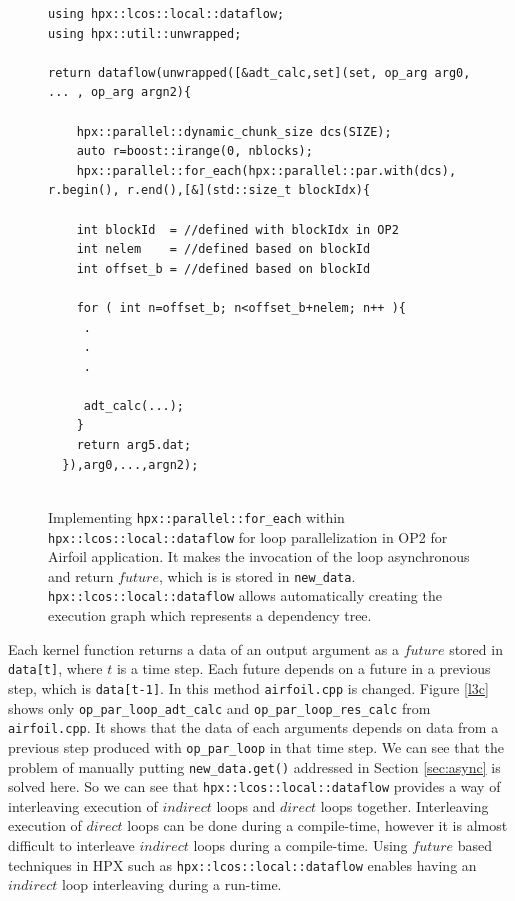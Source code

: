 \documentclass[conference]{IEEEtran}
\begin{document}
\begin{figure}
    \begin{lstlisting}    
using hpx::lcos::local::dataflow;
using hpx::util::unwrapped;    

return dataflow(unwrapped([&adt_calc,set](set, op_arg arg0, ... , op_arg argn2){

    hpx::parallel::dynamic_chunk_size dcs(SIZE);
    auto r=boost::irange(0, nblocks);
    hpx::parallel::for_each(hpx::parallel::par.with(dcs), r.begin(), r.end(),[&](std::size_t blockIdx){
  
    int blockId  = //defined with blockIdx in OP2
    int nelem    = //defined based on blockId 
    int offset_b = //defined based on blockId
        
    for ( int n=offset_b; n<offset_b+nelem; n++ ){
     .
     .
     .

     adt_calc(...);
    }
    return arg5.dat;
  }),arg0,...,argn2);
  
    \end{lstlisting}
    \caption{\small{Implementing \texttt{hpx::parallel::for\_each} within \texttt{hpx::lcos::local::dataflow} for loop parallelization in OP2 for Airfoil application. It makes the invocation of the loop asynchronous and return $future$, which is is stored in \texttt{new\_data}. \texttt{hpx::lcos::local::dataflow} allows automatically creating the execution graph which represents a dependency tree.}}
    \label{l3b}
\end{figure}



Each kernel function returns a data of an output argument as a $future$ stored in \texttt{data[t]}, where $t$ is a time step. Each future depends on a future in a previous step, which is \texttt{data[t-1]}. In this method \texttt{airfoil.cpp} is changed. Figure \ref{l3c} shows only \texttt{op\_par\_loop\_adt\_calc} and \texttt{op\_par\_loop\_res\_calc} from \texttt{airfoil.cpp}. It shows that the data of each arguments depends on data from a previous step produced with \texttt{op\_par\_loop} in that time step. We can see that the problem of manually putting \texttt{new\_data.get()} addressed in Section \ref{sec:async} is solved here. So we can see that \texttt{hpx::lcos::local::dataflow} provides a way of interleaving execution of $indirect$ loops and $direct$ loops together. Interleaving execution of $direct$ loops can be done during a compile-time, however it is almost difficult to interleave $indirect$ loops during a compile-time. Using $future$ based techniques in HPX such as \texttt{hpx::lcos::local::dataflow} enables having an $indirect$ loop interleaving during a run-time.  
\end{document}

